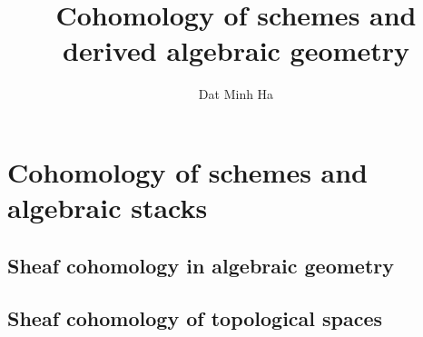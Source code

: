 

\setcounter{section}{-1}





	\title{Cohomology of schemes and derived algebraic geometry}
	
	\author{Dat Minh Ha}
	\maketitle
	
	\begin{abstract}
	    
	\end{abstract}
	
	{
      \hypersetup{} 
      \dominitoc
      \tableofcontents %
    }
    
    
    
    \part{Cohomology of schemes and algebraic stacks}
        \chapter{Sheaf cohomology in algebraic geometry}
            \begin{abstract}
                
            \end{abstract}
            
            \minitoc
            
            
            
            
            
            
            
        \begin{appendices}
            \chapter{Sheaf cohomology of topological spaces}
                \begin{abstract}
                    
                \end{abstract}
                
                \minitoc
                
                
        \end{appendices}
        
